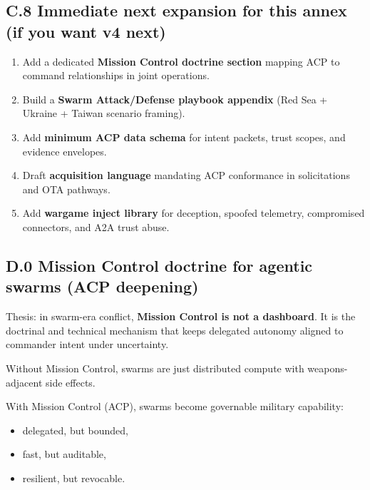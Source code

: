 \documentclass[
]{article}
\providecommand{\tightlist}{%
  \setlength{\itemsep}{0pt}\setlength{\parskip}{0pt}}
\begin{document}
\hypertarget{c.8-immediate-next-expansion-for-this-annex-if-you-want-v4-next}{%
\subsection{C.8 Immediate next expansion for this annex (if you want v4
next)}\label{c.8-immediate-next-expansion-for-this-annex-if-you-want-v4-next}}

\begin{enumerate}
\def\labelenumi{\arabic{enumi}.}
\tightlist
\item
  Add a dedicated \textbf{Mission Control doctrine section} mapping ACP
  to command relationships in joint operations.
\item
  Build a \textbf{Swarm Attack/Defense playbook appendix} (Red Sea +
  Ukraine + Taiwan scenario framing).
\item
  Add \textbf{minimum ACP data schema} for intent packets, trust scopes,
  and evidence envelopes.
\item
  Draft \textbf{acquisition language} mandating ACP conformance in
  solicitations and OTA pathways.
\item
  Add \textbf{wargame inject library} for deception, spoofed telemetry,
  compromised connectors, and A2A trust abuse.
\end{enumerate}

\hypertarget{d.0-mission-control-doctrine-for-agentic-swarms-acp-deepening}{%
\subsection{D.0 Mission Control doctrine for agentic swarms (ACP
deepening)}\label{d.0-mission-control-doctrine-for-agentic-swarms-acp-deepening}}

Thesis: in swarm-era conflict, \textbf{Mission Control is not a
dashboard}. It is the doctrinal and technical mechanism that keeps
delegated autonomy aligned to commander intent under uncertainty.

Without Mission Control, swarms are just distributed compute with
weapons-adjacent side effects.

With Mission Control (ACP), swarms become governable military
capability:

\begin{itemize}
\tightlist
\item
  delegated, but bounded,
\item
  fast, but auditable,
\item
  resilient, but revocable.
\end{itemize}
\end{document}
